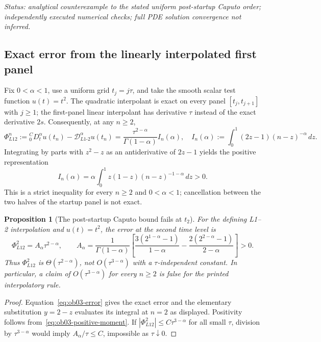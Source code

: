 \documentclass[11pt,a4paper]{amsart}
\theoremstyle{remark}
\theoremstyle{plain}
\newtheorem{proposition}{Proposition}[section]
\theoremstyle{remark}
\newcommand{\auditstatus}[1]{\par\noindent\emph{#1.}\enspace}
\numberwithin{equation}{section}
\begin{document}
\auditstatus{Status: analytical counterexample to the stated uniform post-startup Caputo order; independently executed numerical checks; full PDE solution convergence not inferred}

\subsection{Exact error from the linearly interpolated first panel}
Fix $0<\alpha<1$, use a uniform grid $t_j=j\tau$, and take the smooth scalar test function $u(t)=t^2$. The quadratic interpolant is exact on every panel $[t_j,t_{j+1}]$ with $j\ge1$; the first-panel linear interpolant has derivative $\tau$ instead of the exact derivative $2s$. Consequently, at any $n\ge2$,
\begin{equation}\label{eq:ob03-error}
 \Phi_{L12}^{n}:={}_0^CD_t^\alpha u(t_n)-\mathcal D_{L1\text{-}2}^\alpha u(t_n)
 =\frac{\tau^{2-\alpha}}{\Gamma(1-\alpha)}I_n(\alpha),\quad
 I_n(\alpha):=\int_0^1(2z-1)(n-z)^{-\alpha}\,dz.
\end{equation}
Integrating by parts with $z^2-z$ as an antiderivative of $2z-1$ yields the positive representation
\begin{equation}\label{eq:ob03-positive-moment}
 I_n(\alpha)=\alpha\int_0^1z(1-z)(n-z)^{-1-\alpha}\,dz>0.
\end{equation}
This is a strict inequality for every $n\ge2$ and $0<\alpha<1$; cancellation between the two halves of the startup panel is not exact.

\begin{proposition}[The post-startup Caputo bound fails at $t_2$]\label{prop:ob03-caputo}
For the defining L1--2 interpolation and $u(t)=t^2$, the error at the second time level is
\begin{equation}\label{eq:ob03-exact}
 \Phi_{L12}^{2}=A_\alpha\tau^{2-\alpha},\qquad
 A_\alpha=\frac{1}{\Gamma(1-\alpha)}
 \left[\frac{3(2^{1-\alpha}-1)}{1-\alpha}
 -\frac{2(2^{2-\alpha}-1)}{2-\alpha}\right]>0.
\end{equation}
Thus $\Phi_{L12}^{2}$ is $\Theta(\tau^{2-\alpha})$, not $O(\tau^{3-\alpha})$ with a $\tau$-independent constant. In particular, a claim of $O(\tau^{3-\alpha})$ for \emph{every} $n\ge2$ is false for the printed interpolatory rule.
\end{proposition}
\begin{proof}
Equation~\eqref{eq:ob03-error} gives the exact error and the elementary substitution $y=2-z$ evaluates its integral at $n=2$ as displayed. Positivity follows from~\eqref{eq:ob03-positive-moment}. If $|\Phi_{L12}^{2}|\le C\tau^{3-\alpha}$ for all small $\tau$, division by $\tau^{3-\alpha}$ would imply $A_\alpha/\tau\le C$, impossible as $\tau\downarrow0$.
\end{proof}
\end{document}
